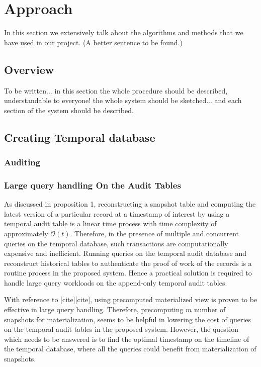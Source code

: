 \chapter{Approach}
\label{chap:approach}
\begin{info} \color{red} In this section we extensively talk about the algorithms and methods that we have used in our project. (A better sentence to be found.)\end{info}

\section{Overview}
\begin{info}\color{red}To be written... in this section the whole procedure should be described, understandable to everyone! the whole system should be sketched... and each section of the system should be described.\end{info}

\section{Creating Temporal database}

\subsection{Auditing}
\subsection{Large query handling On the Audit Tables}
As discussed in proposition 1, reconstructing a snapshot table and computing the latest version of a particular record at a timestamp of interest by using a temporal audit table is a linear time process with time complexity of approximately $\mathcal{O}(t)$. Therefore, in the presence of multiple and concurrent queries on the temporal database, such transactions are computationally expensive and inefficient. Running queries on the temporal audit database and reconstruct historical tables to authenticate the proof of work of the records is a routine process in the proposed system. Hence a practical solution is required to handle large query workloads on the append-only temporal audit tables.

With reference to [cite][cite], using precomputed materialized view is proven to be effective in large query handling. Therefore, precomputing $m$ number of snapshots for materialization, seems to be helpful in lowering the cost of queries on the temporal audit tables in the proposed system. However, the question which needs to be answered is to find the optimal timestamp on the timeline of the temporal database, where all the queries could benefit from materialization of snapshots. 

